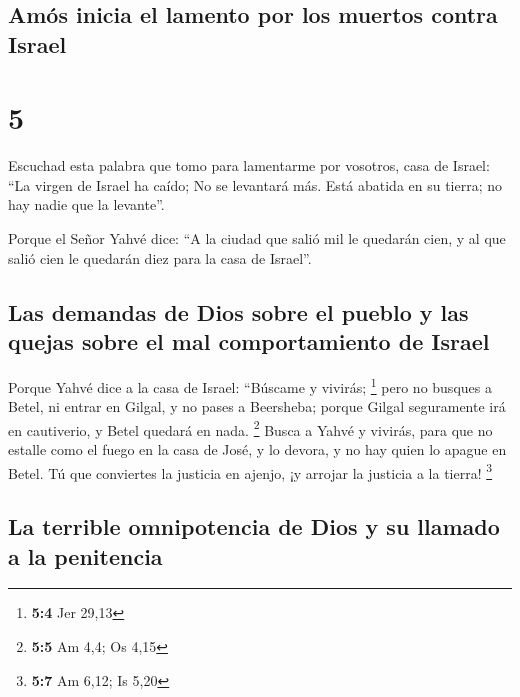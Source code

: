 \hypertarget{amuxf3s-inicia-el-lamento-por-los-muertos-contra-israel}{%
\subsection{Amós inicia el lamento por los muertos contra
Israel}\label{amuxf3s-inicia-el-lamento-por-los-muertos-contra-israel}}

\hypertarget{section-4}{%
\section{5}\label{section-4}}

 Escuchad esta palabra que tomo para lamentarme por
vosotros, casa de Israel:  ``La virgen de Israel ha caído;
No se levantará más. Está abatida en su tierra; no hay nadie que la
levante''.

 Porque el Señor Yahvé dice: ``A la ciudad que salió mil
le quedarán cien, y al que salió cien le quedarán diez para la casa de
Israel''.

\hypertarget{las-demandas-de-dios-sobre-el-pueblo-y-las-quejas-sobre-el-mal-comportamiento-de-israel}{%
\subsection{Las demandas de Dios sobre el pueblo y las quejas sobre el
mal comportamiento de
Israel}\label{las-demandas-de-dios-sobre-el-pueblo-y-las-quejas-sobre-el-mal-comportamiento-de-israel}}

 Porque Yahvé dice a la casa de Israel: ``Búscame y
vivirás; \footnote{\textbf{5:4} Jer 29,13}  pero no
busques a Betel, ni entrar en Gilgal, y no pases a Beersheba; porque
Gilgal seguramente irá en cautiverio, y Betel quedará en nada.
\footnote{\textbf{5:5} Am 4,4; Os 4,15}  Busca a Yahvé y
vivirás, para que no estalle como el fuego en la casa de José, y lo
devora, y no hay quien lo apague en Betel.  Tú que
conviertes la justicia en ajenjo, ¡y arrojar la justicia a la tierra!
\footnote{\textbf{5:7} Am 6,12; Is 5,20}

\hypertarget{la-terrible-omnipotencia-de-dios-y-su-llamado-a-la-penitencia}{%
\subsection{La terrible omnipotencia de Dios y su llamado a la
penitencia}\label{la-terrible-omnipotencia-de-dios-y-su-llamado-a-la-penitencia}}


